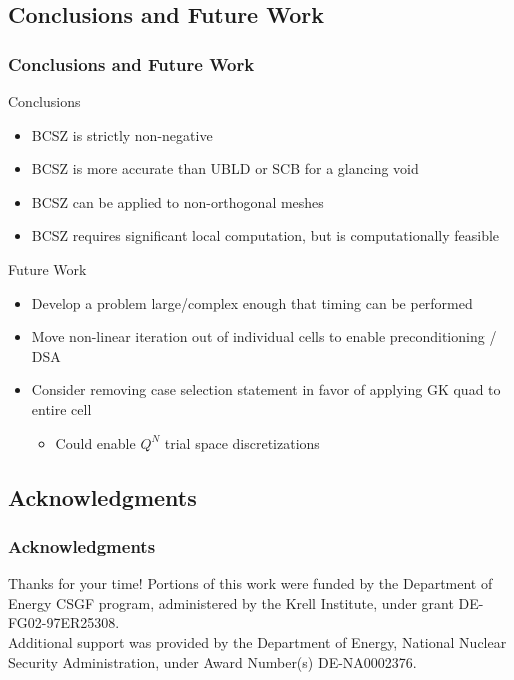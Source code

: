 \documentclass{beamer}
\newif\ifplacelogo %
\begin{document}
\subsection{Conclusions and Future Work}
\begin{frame}
\frametitle{Conclusions and Future Work}
Conclusions
\begin{itemize}
\item BCSZ is strictly non-negative
\item BCSZ is more accurate than UBLD or SCB for a glancing void
\item BCSZ can be applied to non-orthogonal meshes
\item BCSZ requires significant local computation, but is computationally feasible
\end{itemize}
Future Work
\begin{itemize}
\item Develop a problem large/complex enough that timing can be performed
\item Move non-linear iteration out of individual cells to enable preconditioning / DSA
\item Consider removing case selection statement in favor of applying GK quad to entire cell
\begin{itemize}
\item Could enable $Q^N$ trial space discretizations
\end{itemize}
\end{itemize}
\end{frame}

\placelogotrue

\subsection{Acknowledgments}
\begin{frame}
\frametitle{Acknowledgments}
Thanks for your time!
\vspace{0.3in}
Portions of this work were funded by the Department of Energy CSGF program, administered by the Krell Institute, under grant DE-FG02-97ER25308.
\\
\vspace{0.3in}
Additional support was provided by the Department of Energy, National Nuclear Security Administration, under Award Number(s) DE-NA0002376.

\end{frame}

\end{document}
